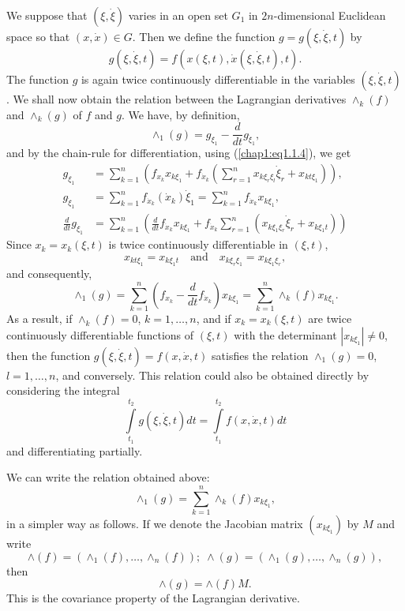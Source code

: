 We suppose that $(\xi, \dot{\xi})$ varies in an open set $G_1$ in $2n$-dimensional Euclidean space so that $(x, \dot{x}) \in G$. Then we define the function $g = g(\xi, \dot{\xi}, t)$ by
$$
g(\xi,\dot{\xi},t ) = f(x(\xi, t), \dot{x} (\xi, \dot{\xi}, t), t). 
$$
The function $g$ is again twice continuously differentiable in the variables $(\xi, \dot{\xi}, t)$. We shall now obtain the relation between the Lagrangian derivatives $\wedge_k(f)$ and $\wedge_k(g)$ of $f$ and $g$. We have, by definition,
$$
\wedge_1(g) = g_{\xi_1} - \frac{d}{dt} g_{\dot{\xi}_1},
$$
and by the chain-rule for differentiation, using (\ref{chap1:eq1.1.4}), we get 
\begin{align*}
g_{\xi_1} & = \sum\limits^n_{k=1} \left(f_{x_k} x_{k \xi_1} + f_{\dot{x}_k} (\sum\limits^n_{r=1} x_{k\xi_r \xi_l} \dot{\xi}_r+ x_{kt \xi_1}) \right),\\
g_{\dot{\xi}_1} & = \sum\limits^n_{k=1} f_{\dot{x}_k} (\dot{x}_k) \dot{\xi}_1 = \sum\limits^n_{k=1} f_{\dot{x}_k} x_{k \xi_1}, \\
\frac{d}{dt} g_{\dot{\xi}_1} & = \sum\limits^n_{k=1} \left(\frac{d}{dt} f_{\dot{x}_k} x_{k \xi_1} + f_{\dot{x}_k} \sum\limits^n_{r=1} (x_{k \xi_1 \xi_r} \dot{\xi}_r + x_{k \xi_1 t}) \right)
\end{align*}
Since $x_k = x_k(\xi, t)$ is twice continuously differentiable in $(\xi, t)$,
$$
x_{kt \xi_1} = x_{k \xi_1t} \quad\text{and} \quad x_{k\xi_r\xi_1} = x_{k \xi_1 \xi_r},
$$
and consequently,\pageoriginale
$$
\wedge_1(g) = \sum\limits^n_{k=1} (f_{x_k} - \frac{d}{dt} f_{\dot{x}_k}) x_{k\xi_1} = \sum\limits^n_{k=1} \wedge_k(f) x_{k\xi_1}. 
$$
As a result, if $\wedge_k(f) = 0$, $k=1, \ldots, n$, and if $x_k = x_k (\xi, t)$ are twice continuously differentiable functions of $(\xi, t)$ with the determinant $|x_{k\xi_1}| \neq 0$, then the function $g(\xi, \dot{\xi},t) = f(x, \dot{x},t)$ satisfies the relation $\wedge_1 (g) = 0$, $l = 1, \ldots, n$, and conversely. This relation could also be obtained directly by considering the integral
$$
\int\limits^{t_2}_{t_1} g(\xi, \dot{\xi},t) dt = \int\limits^{t_2}_{t_1} f(x, \dot{x}, t) dt
$$
and differentiating partially.

We can write the relation obtained above:
\begin{equation*}
\wedge_1 (g) = \sum\limits^n_{k=1} \wedge_k (f) x_{k \xi_1}, \tag{1.1.6}\label{chap1:eq1.1.6}
\end{equation*}
in a simpler way as follows. If we denote the Jacobian matrix $(x_{k\xi_1})$ by $M$ and write
$$
\wedge (f) = (\wedge_1(f), \ldots , \wedge_n (f)); \; \wedge (g) = (\wedge_1(g), \ldots, \wedge_n(g)),
$$
then 
$$
\wedge (g)= \wedge (f) M.
$$
This is the covariance property of the Lagrangian derivative.

